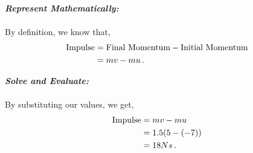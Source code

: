 \begin{subquestions}
\textbf{\textit{Represent Mathematically:}} \\ \\
By definition, we know that,
\begin{align}
	\text{Impulse} & = \text{Final Momentum} - \text{Initial Momentum} \nonumber \\ 
	               & = mv - mu \,.
\end{align}




\textbf{\textit{Solve and Evaluate:}} \\ \\
By substituting our values, we get,
\begin{align}
	\text{Impulse} & = mv-mu \nonumber \\
	               & = 1.5(5-(-7)) \nonumber \\
	               & = 18Ns \,.
\end{align}


\subquestion


\end{subquestions}
